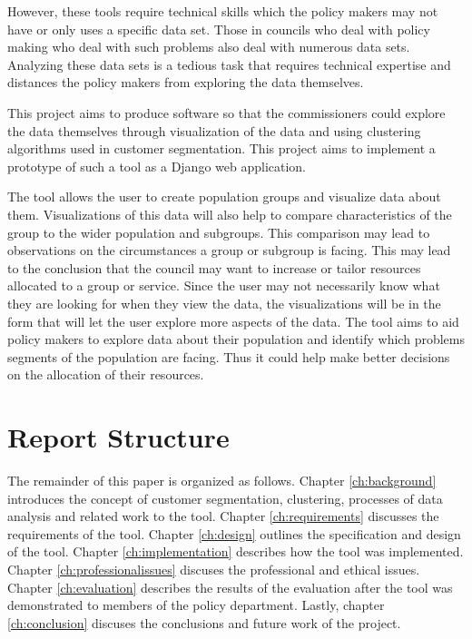 \documentclass[11pt]{informatics-report}
\begin{document}
However, these tools require technical skills which the policy makers may not have or only uses a specific data set. Those in councils who deal with policy making who deal with such problems also deal with numerous data sets. Analyzing these data sets is a tedious task that requires technical expertise and distances the policy makers from exploring the data themselves.\par

This project aims to produce software so that the commissioners could explore the data themselves through visualization of the data and using clustering algorithms used in customer segmentation. This project aims to implement a prototype of such a tool as a Django web application.\par

The tool allows the user to create population groups and visualize data about them. Visualizations of this data will also help to compare characteristics of the group to the wider population and subgroups. This comparison may lead to observations on the circumstances a group or subgroup is facing. This may lead to the conclusion that the council may want to increase or tailor resources allocated to a group or service. Since the user may not necessarily know what they are looking for when they view the data, the visualizations will be in the form that will let the user explore more aspects of the data. The tool aims to aid policy makers to explore data about their population and identify which problems segments of the population are facing. Thus it could help make better decisions on the allocation of their resources. \par

\section{Report Structure}
The remainder of this paper is organized as follows. Chapter \ref{ch:background} introduces the concept of customer segmentation, clustering, processes of data analysis and related work to the tool. Chapter \ref{ch:requirements} discusses the requirements of the tool. Chapter \ref{ch:design} outlines the specification and design of the tool. Chapter \ref{ch:implementation} describes how the tool was implemented. Chapter \ref{ch:professionalissues} discuses the professional and ethical issues. Chapter \ref{ch:evaluation} describes the results of the evaluation after the tool was demonstrated to members of the policy department. Lastly, chapter \ref{ch:conclusion} discuses the conclusions and future work of the project.












\appendix



\end{document}
